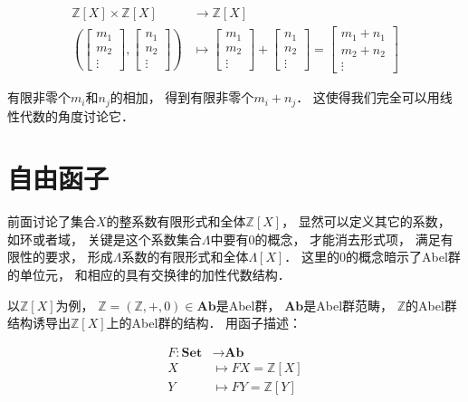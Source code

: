 \documentclass[10pt, openany]{book}
\begin{document}
$$
\begin{aligned}
\mathbb Z[X] \times \mathbb Z[X] &\to \mathbb Z[X] \\    
\left(
    \begin{bmatrix} m_1 \\ m_2 \\ \vdots \end{bmatrix},
    \begin{bmatrix} n_1 \\ n_2 \\ \vdots \end{bmatrix}
\right) 
&\mapsto
    \begin{bmatrix} m_1 \\ m_2 \\ \vdots \end{bmatrix} +
    \begin{bmatrix} n_1 \\ n_2 \\ \vdots \end{bmatrix}
    = \begin{bmatrix} m_1 + n_1 \\ m_2 + n_2 \\ \vdots \end{bmatrix}
\end{aligned}
$$

有限非零个$m_i$和$n_j$的相加，
得到有限非零个$m_i + n_j$．
这使得我们完全可以用线性代数的角度讨论它．

\section{自由函子}

前面讨论了集合$X$的整系数有限形式和全体$\mathbb Z[X]$，
显然可以定义其它的系数，
如环或者域，
关键是这个系数集合$\Lambda$中要有$0$的概念，
才能消去形式项，
满足有限性的要求，
形成$\Lambda$系数的有限形式和全体$\Lambda[X]$．
这里的$0$的概念暗示了Abel群的单位元，
和相应的具有交换律的加性代数结构．

以$\mathbb Z[X]$为例，
$\mathbb Z = (\mathbb Z,+,0)\in\textbf{Ab}$是Abel群，
$\textbf{Ab}$是Abel群范畴，
$\mathbb Z$的Abel群结构诱导出$\mathbb Z[X]$上的Abel群的结构．
用函子描述：

$$
\begin{aligned}
F: \textbf{Set} &\to \textbf{Ab} \\
X &\mapsto FX = \mathbb Z[X] \\
Y &\mapsto FY = \mathbb Z[Y] \\
\end{aligned}
$$
\end{document}
